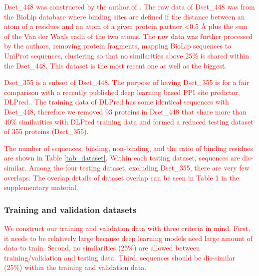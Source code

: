 \documentclass{bioinfo}
\newcommand{\myColor}{red}
\begin{document}
\begin{methods}
\textcolor{\myColor}{
Dset\_448 was constructed by the author of \citep{zhang2019scriber}. The raw data of Dset\_448 was from the BioLip database \citep{yang2012biolip} where binding sites are defined if the distance between an atom of a residues and an atom of a given protein partner <0.5 \AA{} plus the sum of the Van der Waals radii of the two atoms. The raw data was further processed by the authors, removing protein fragments, mapping BioLip sequences to UniProt sequences, clustering so that no similarities above 25\% is shared within the Dset\_448. 
This dataset is the most recent one as well as the biggest.}

\textcolor{\myColor}{
Dset\_355 is a subset of Dset\_448. The purpose of having Dset\_355 is for a fair comparison with a recently published deep learning based PPI site predictor, DLPred.. The training data of DLPred has some identical sequences with Dset\_448, therefore we removed 93 proteins in Dset\_448 that share more than 40\% similarities with DLPred training data and formed a reduced testing dataset of 355 proteins (Dset\_355).
}

\textcolor{\myColor}{
The number of sequences, binding, non-binding, and the ratio of binding residues are shown in Table \ref{tab_dataset}. Within each testing dataset, sequences are dis-similar. Among the four testing dataset, excluding Dset\_355, there are very few overlaps. The overlap details of dataset overlap can be seen in Table 1 in the supplementary material.}
\subsubsection{Training and validation datasets}
\textcolor{\myColor}{
We construct our training and validation data with three criteria in mind. First, it needs to be relatively large because deep learning models need large amount of data to train. Second, no similarities (25\%) are allowed between training/validation and testing data. Third, sequences should be dis-similar (25\%) within the training and validation data. }


\end{methods}
\end{document}

